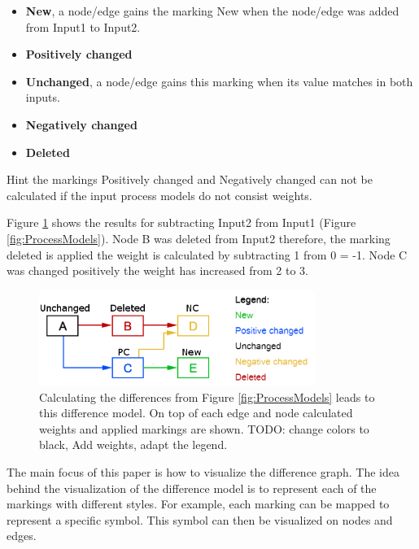 \documentclass{llncs}
\begin{document}
\begin{itemize}
	\item \textbf{New}, a node/edge gains the marking New when the node/edge was added from Input1 to Input2.
	\item \textbf{Positively changed}
	\item \textbf{Unchanged}, a node/edge gains this marking when its value matches in both inputs.
	\item \textbf{Negatively changed}
	\item \textbf{Deleted}
\end{itemize}

Hint the markings Positively changed and Negatively changed can not be calculated if the input process models do not consist weights.

Figure \ref{fig:DiffGraphCalculation} shows the results for subtracting Input2 from Input1 (Figure \ref{fig:ProcessModels}). Node B  was deleted from Input2 therefore, the marking deleted is applied the weight is calculated by subtracting 1 from 0 = -1. Node C was changed positively the weight has increased from 2 to 3.

\begin{figure}
	\centering
	\includegraphics[width=0.8\textwidth]{Images/ResultGraph.PNG}
	\caption{Calculating the differences from Figure \ref{fig:ProcessModels} leads to this difference model. On top of each edge and node calculated weights and applied markings are shown. TODO: change colors to black, Add weights, adapt the legend.
	}
	\label{fig:DiffGraphCalculation}
\end{figure}

The main  focus of this paper is how to visualize the difference graph. The idea behind the visualization of the difference model is to represent each of the markings with different styles. For example, each marking can be mapped to represent a specific symbol. This symbol can then be visualized on nodes and edges.
\end{document}
